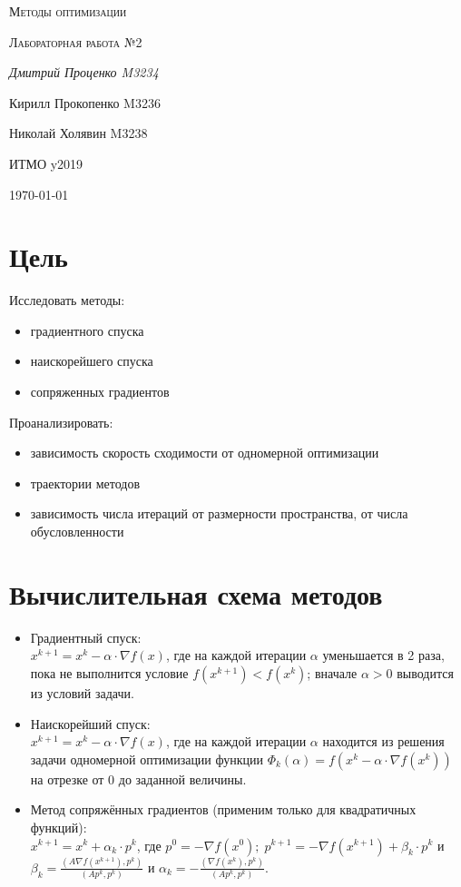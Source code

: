 \documentclass[russian, english]{article}
\begin{document}
\begin{titlepage}
\centering
	{\scshape\LARGE Методы оптимизации \par}
	\vspace{1cm}
	{\scshape\Large Лабораторная работа №2\par}
	\vspace{2cm}
	{\Large\itshape Дмитрий Проценко M3234 \par
	Кирилл Прокопенко M3236 \par
	Николай Холявин M3238 \par}
	\vfill
	ИТМО y2019
	\vfill
	{\large \today\par}
\end{titlepage}

\tableofcontents
\newpage

\section{Цель}
Исследовать методы:
\begin{itemize}
	\item градиентного спуска
	\item наискорейшего спуска
	\item сопряженных градиентов
\end{itemize}
Проанализировать:
\begin{itemize}
	\item зависимость скорость сходимости от одномерной оптимизации
	\item траектории методов
	\item зависимость числа итераций от размерности пространства, от числа обусловленности
\end{itemize}

\section{Вычислительная схема методов}
\begin{itemize}
\item Градиентный спуск:\\
$x^{k+1}=x^k-\alpha\cdot\nabla f(x)$, где на каждой итерации $\alpha$ уменьшается в 2 раза, пока не выполнится условие $f(x^{k+1}) < f(x^k)$; вначале $\alpha > 0$ выводится из условий задачи.
\item Наискорейший спуск:\\
$x^{k+1}=x^k-\alpha\cdot\nabla f(x)$, где на каждой итерации $\alpha$ находится из решения задачи одномерной оптимизации функции $\Phi_k(\alpha) = f(x^k - \alpha\cdot\nabla f(x^k))$ на отрезке от 0 до заданной величины.
\item Метод сопряжённых градиентов (применим только для квадратичных функций):\\
$x^{k+1}=x^k+\alpha_k\cdot p^k$, где $p^0 = -\nabla f(x^0); \; p^{k+1}=-\nabla f(x^{k+1})+\beta_k\cdot p^k$ и $\beta_k = \frac{\left(A \nabla f(x^{k+1}), p^k\right)}{\left(Ap^k, p^k\right)}$ и $\alpha_k=-\frac{\left(\nabla f(x^k), p^k\right)}{\left(Ap^k, p^k\right)}.$
\end{itemize}
\end{document}
